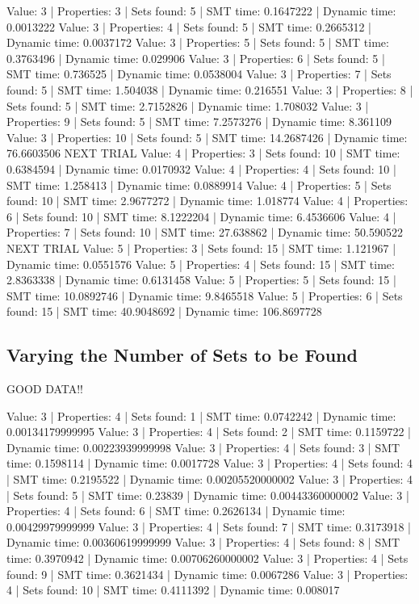 \documentclass[pageno]{jpaper}
\begin{document}
Value: 3 | Properties: 3 | Sets found: 5 | SMT time: 0.1647222 | Dynamic time: 0.0013222
Value: 3 | Properties: 4 | Sets found: 5 | SMT time: 0.2665312 | Dynamic time: 0.0037172
Value: 3 | Properties: 5 | Sets found: 5 | SMT time: 0.3763496 | Dynamic time: 0.029906
Value: 3 | Properties: 6 | Sets found: 5 | SMT time: 0.736525 | Dynamic time: 0.0538004
Value: 3 | Properties: 7 | Sets found: 5 | SMT time: 1.504038 | Dynamic time: 0.216551
Value: 3 | Properties: 8 | Sets found: 5 | SMT time: 2.7152826 | Dynamic time: 1.708032
Value: 3 | Properties: 9 | Sets found: 5 | SMT time: 7.2573276 | Dynamic time: 8.361109
Value: 3 | Properties: 10 | Sets found: 5 | SMT time: 14.2687426 | Dynamic time: 76.6603506
NEXT TRIAL
Value: 4 | Properties: 3 | Sets found: 10 | SMT time: 0.6384594 | Dynamic time: 0.0170932
Value: 4 | Properties: 4 | Sets found: 10 | SMT time: 1.258413 | Dynamic time: 0.0889914
Value: 4 | Properties: 5 | Sets found: 10 | SMT time: 2.9677272 | Dynamic time: 1.018774
Value: 4 | Properties: 6 | Sets found: 10 | SMT time: 8.1222204 | Dynamic time: 6.4536606
Value: 4 | Properties: 7 | Sets found: 10 | SMT time: 27.638862 | Dynamic time: 50.590522
NEXT TRIAL
Value: 5 | Properties: 3 | Sets found: 15 | SMT time: 1.121967 | Dynamic time: 0.0551576
Value: 5 | Properties: 4 | Sets found: 15 | SMT time: 2.8363338 | Dynamic time: 0.6131458
Value: 5 | Properties: 5 | Sets found: 15 | SMT time: 10.0892746 | Dynamic time: 9.8465518
Value: 5 | Properties: 6 | Sets found: 15 | SMT time: 40.9048692 | Dynamic time: 106.8697728

\subsection{Varying the Number of Sets to be Found}


GOOD DATA!!

Value: 3 | Properties: 4 | Sets found: 1 | SMT time: 0.0742242 | Dynamic time: 0.00134179999995
Value: 3 | Properties: 4 | Sets found: 2 | SMT time: 0.1159722 | Dynamic time: 0.00223939999998
Value: 3 | Properties: 4 | Sets found: 3 | SMT time: 0.1598114 | Dynamic time: 0.0017728
Value: 3 | Properties: 4 | Sets found: 4 | SMT time: 0.2195522 | Dynamic time: 0.00205520000002
Value: 3 | Properties: 4 | Sets found: 5 | SMT time: 0.23839 | Dynamic time: 0.00443360000002
Value: 3 | Properties: 4 | Sets found: 6 | SMT time: 0.2626134 | Dynamic time: 0.00429979999999
Value: 3 | Properties: 4 | Sets found: 7 | SMT time: 0.3173918 | Dynamic time: 0.00360619999999
Value: 3 | Properties: 4 | Sets found: 8 | SMT time: 0.3970942 | Dynamic time: 0.00706260000002
Value: 3 | Properties: 4 | Sets found: 9 | SMT time: 0.3621434 | Dynamic time: 0.0067286
Value: 3 | Properties: 4 | Sets found: 10 | SMT time: 0.4111392 | Dynamic time: 0.008017
\end{document}

